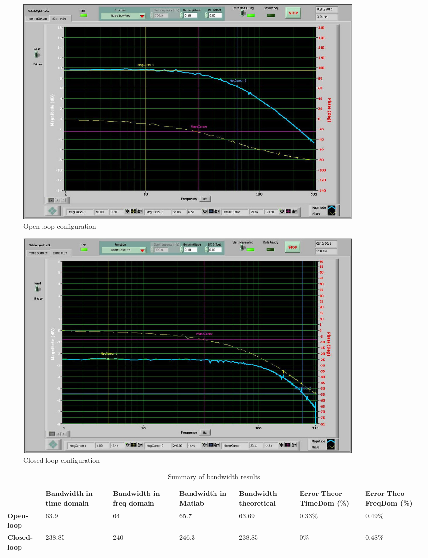 \documentclass[12pt]{article}
\begin{document}
\begin{figure}[ht]
\centering
\includegraphics[width=7in]{FreqRespOpen.jpg}
\caption{Open-loop configuration}
\label{fig:open-loop}
\end{figure}

\begin{figure}[ht]
\centering
\includegraphics[width=7in]{FreqRespClosed.jpg}
\caption{Closed-loop configuration}
\label{fig:closed-loop}
\end{figure}

\begin{table}[ht]
\centering
    \begin{tabular}{|l|p{2cm}|p{2cm}|p{2cm}|p{2cm}|p{2cm}|p{2cm}|}
        \hline
        & \textbf{Bandwidth in time domain} & \textbf{Bandwidth in freq domain} & \textbf{Bandwidth in Matlab} & \textbf{Bandwidth theoretical} & \textbf{Error Theor TimeDom (\%)} & \textbf{Error Theo FreqDom (\%)}\\
        \hline
        \textbf{Open-loop} & 63.9 & 64 & 65.7 & 63.69 & 0.33\% & 0.49\%\\
        \hline
        \textbf{Closed-loop} & 238.85 & 240 & 246.3 & 238.85 & 0\% & 0.48\%\\
        \hline
    \end{tabular}
    \caption{Summary of bandwidth results}
    \label{tab:bandwidth-summary}
\end{table}
\end{document}
